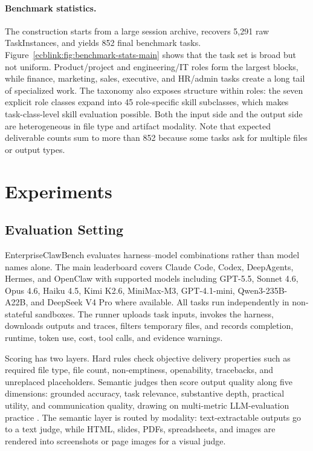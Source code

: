 \documentclass{llmxive}
\providecommand{\ecb}{EnterpriseClawBench}
\providecommand{\hm}{harness--model}
\begin{document}
\paragraph{Benchmark statistics.}
The construction starts from a large session archive, recovers 5,291 raw TaskInstances, and yields 852 final benchmark tasks. Figure~\ref{ecblink:fig:benchmark-stats-main} shows that the task set is broad but not uniform. Product/project and engineering/IT roles form the largest blocks, while finance, marketing, sales, executive, and HR/admin tasks create a long tail of specialized work. The taxonomy also exposes structure within roles: the seven explicit role classes expand into 45 role-specific skill subclasses, which makes task-class-level skill evaluation possible. Both the input side and the output side are heterogeneous in file type and artifact modality. Note that expected deliverable counts sum to more than 852 because some tasks ask for multiple files or output types.



\section{Experiments}
\subsection{Evaluation Setting}
\ecb{} evaluates \hm{} combinations rather than model names alone. The main leaderboard covers Claude Code, Codex, DeepAgents, Hermes, and OpenClaw with supported models including GPT-5.5, Sonnet 4.6, Opus 4.6, Haiku 4.5, Kimi K2.6, MiniMax-M3, GPT-4.1-mini, Qwen3-235B-A22B, and DeepSeek V4 Pro where available. All tasks run independently in non-stateful sandboxes. The runner uploads task inputs, invokes the harness, downloads outputs and traces, filters temporary files, and records completion, runtime, token use, cost, tool calls, and evidence warnings.

Scoring has two layers. Hard rules check objective delivery properties such as required file type, file count, non-emptiness, openability, tracebacks, and unreplaced placeholders. Semantic judges then score output quality along five dimensions: grounded accuracy, task relevance, substantive depth, practical utility, and communication quality, drawing on multi-metric LLM-evaluation practice \mbox{\citep{helm2022,geval2023,ragas2023}}. The semantic layer is routed by modality: text-extractable outputs go to a text judge, while HTML, slides, PDFs, spreadsheets, and images are rendered into screenshots or page images for a visual judge.
\end{document}

